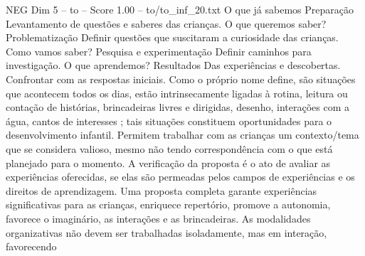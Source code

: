 \begin{textsample}{NEG Dim 5 – to – Score 1.00 – to/to\_inf\_20.txt}
O que já sabemos Preparação Levantamento de questões e saberes das crianças.
O que queremos saber?
Problematização Definir questões que suscitaram a curiosidade das crianças.
Como vamos saber?
Pesquisa e experimentação Definir caminhos para investigação.
O que aprendemos?
Resultados Das experiências e descobertas.
Confrontar com as respostas iniciais.
Como o próprio nome define, são situações que acontecem todos os dias, estão intrinsecamente ligadas à rotina, leitura ou contação de histórias, brincadeiras livres e dirigidas, desenho, interações com a água, cantos de interesses ; tais situações constituem oportunidades para o desenvolvimento infantil.
Permitem trabalhar com as crianças um contexto/tema que se considera valioso, mesmo não tendo correspondência com o que está planejado para o momento.
A verificação da proposta é o ato de avaliar as experiências oferecidas, se elas são permeadas pelos campos de experiências e os direitos de aprendizagem.
Uma proposta completa garante experiências significativas para as crianças, enriquece repertório, promove a autonomia, favorece o imaginário, as interações e as brincadeiras.
As modalidades organizativas não devem ser trabalhadas isoladamente, mas em interação, favorecendo

\end{textsample}
